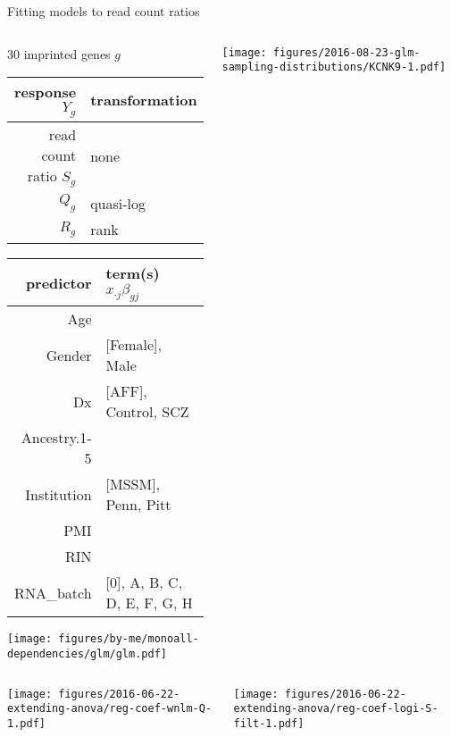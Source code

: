 \documentclass{beamer}
\newcommand{\platefigscale}[0]{0.7}
\begin{document}
\begin{frame}{Fitting models to read count ratios}
\begin{columns}[t]
\begin{column}{0.45\textwidth}
\footnotesize 30 imprinted genes \(g\)
\vfill
\tiny
\begin{tabular}{|r|l|}
\hline
response \(Y_g\) & transformation \\
\hline
read count ratio \(S_g\) & none \\
\(Q_g\) & quasi-log \\
\(R_g\) & rank \\
\hline
\end{tabular}
\begin{tabular}{|r|l|}
\hline
predictor & term(s) \(x_{\cdot j} \beta_{gj}\)\\
\hline
Age & \\
Gender & [Female], Male\\
Dx & [AFF], Control, SCZ\\
Ancestry.1-5 & \\
Institution & [MSSM], Penn, Pitt\\
PMI & \\
RIN & \\
RNA\_batch & [0], A, B, C, D, E, F, G, H\\
\hline
\end{tabular}

\texttt{[image: figures/by-me/monoall-dependencies/glm/glm.pdf]}

\end{column}
\begin{column}{0.60\textwidth}

\texttt{[image: figures/2016-08-23-glm-sampling-distributions/KCNK9-1.pdf]}
\end{column}
\end{columns}
\end{frame}

\begin{frame}[plain]
\begin{columns}[t]
\begin{column}{0.5\textwidth}

\texttt{[image: figures/2016-06-22-extending-anova/reg-coef-wnlm-Q-1.pdf]}
\end{column}

\begin{column}{0.5\textwidth}

\texttt{[image: figures/2016-06-22-extending-anova/reg-coef-logi-S-filt-1.pdf]}
\end{column}
\end{columns}
\end{frame}
\end{document}
